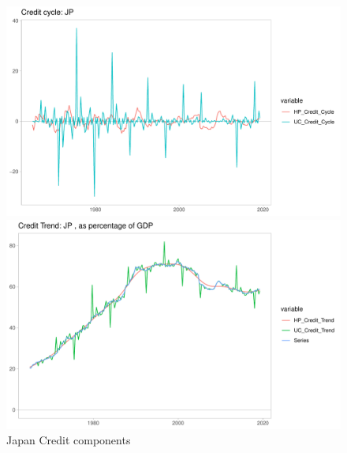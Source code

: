 \documentclass[fleqn]{article}
\begin{document}
\begin{outline}[enumerate]
\begin{figure}[h!]
	\caption{Japan Credit components}	
	\centerline{\includegraphics[scale=0.7]{../Output/Graphs/Credit_cycle_JP.pdf}}
	\centerline{\includegraphics[scale=0.7]{../Output/Graphs/Credit_trend_JP.pdf}}
\end{figure}


\end{outline}
\end{document}

